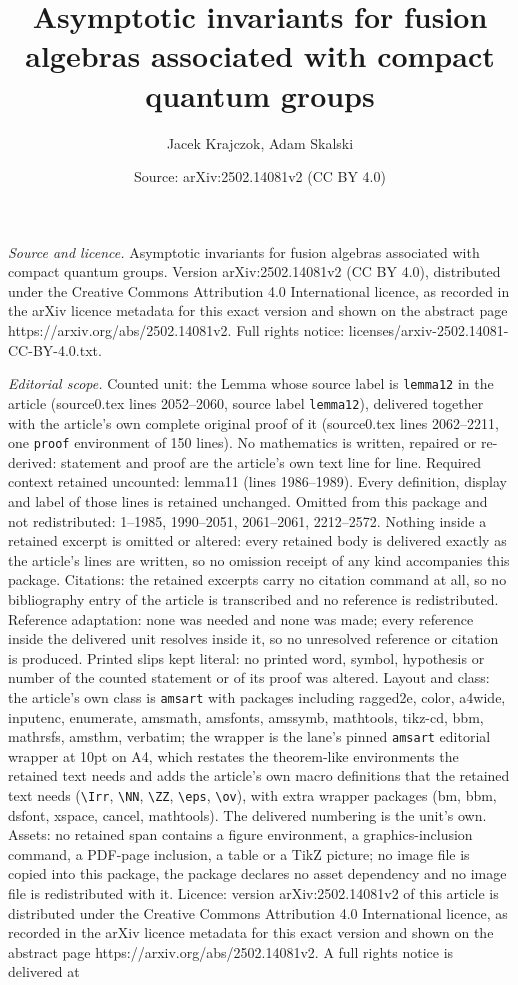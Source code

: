 \documentclass[10pt,a4paper]{amsart}
\title[Asymptotic invariants for fusion algebras associated with co]{Asymptotic invariants for fusion algebras associated with compact quantum groups}
\author{Jacek Krajczok, Adam Skalski}
\date{Source: arXiv:2502.14081v2 (CC BY 4.0)}
\begin{document}
\maketitle

\noindent\emph{Source and licence.} Asymptotic invariants for fusion algebras associated with compact quantum groups. Version arXiv:2502.14081v2 (CC BY 4.0), distributed under the Creative Commons Attribution 4.0 International licence, as recorded in the arXiv licence metadata for this exact version and shown on the abstract page https://arxiv.org/abs/2502.14081v2. Full rights notice: licenses/arxiv-2502.14081-CC-BY-4.0.txt.\par\smallskip

\noindent\textit{Editorial scope.} Counted unit: the Lemma whose source label is \texttt{lemma12} in the article (source0.tex lines 2052--2060, source label \texttt{lemma12}), delivered together with the article's own complete original proof of it (source0.tex lines 2062--2211, one \texttt{proof} environment of 150 lines). No mathematics is written, repaired or re-derived: statement and proof are the article's own text line for line. Required context retained uncounted: lemma11 (lines 1986--1989). Every definition, display and label of those lines is retained unchanged. Omitted from this package and not redistributed: 1--1985, 1990--2051, 2061--2061, 2212--2572. Nothing inside a retained excerpt is omitted or altered: every retained body is delivered exactly as the article's lines are written, so no omission receipt of any kind accompanies this package. Citations: the retained excerpts carry no citation command at all, so no bibliography entry of the article is transcribed and no reference is redistributed. Reference adaptation: none was needed and none was made; every reference inside the delivered unit resolves inside it, so no unresolved reference or citation is produced. Printed slips kept literal: no printed word, symbol, hypothesis or number of the counted statement or of its proof was altered. Layout and class: the article's own class is \texttt{amsart} with packages including ragged2e, color, a4wide, inputenc, enumerate, amsmath, amsfonts, amssymb, mathtools, tikz-cd, bbm, mathrsfs, amsthm, verbatim; the wrapper is the lane's pinned \texttt{amsart} editorial wrapper at 10pt on A4, which restates the theorem-like environments the retained text needs and adds the article's own macro definitions that the retained text needs (\texttt{\textbackslash Irr}, \texttt{\textbackslash NN}, \texttt{\textbackslash ZZ}, \texttt{\textbackslash eps}, \texttt{\textbackslash ov}), with extra wrapper packages (bm, bbm, dsfont, xspace, cancel, mathtools). The delivered numbering is the unit's own. Assets: no retained span contains a figure environment, a graphics-inclusion command, a PDF-page inclusion, a table or a TikZ picture; no image file is copied into this package, the package declares no asset dependency and no image file is redistributed with it. Licence: version arXiv:2502.14081v2 of this article is distributed under the Creative Commons Attribution 4.0 International licence, as recorded in the arXiv licence metadata for this exact version and shown on the abstract page https://arxiv.org/abs/2502.14081v2. A full rights notice is delivered at 
\end{document}
